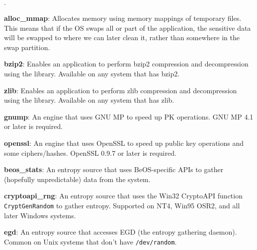 \documentclass{article}
\begin{document}
\newcommand{\mod}[2]{\textbf{#1}: #2}

\begin{list}{$\cdot$}
  \item \mod{alloc\_mmap}{Allocates memory using memory mappings of temporary
         files. This means that if the OS swaps all or part of the application,
         the sensitive data will be swapped to where we can later clean it,
         rather than somewhere in the swap partition.}

  \item \mod{bzip2}{Enables an application to perform bzip2 compression
         and decompression using the library. Available on any system that has
         bzip2.}

  \item \mod{zlib}{Enables an application to perform zlib compression and
         decompression using the library. Available on any system that has
         zlib.}


  \item \mod{gnump}{An engine that uses GNU MP to speed up PK operations.
         GNU MP 4.1 or later is required.}

  \item \mod{openssl}{An engine that uses OpenSSL to speed up public key
                      operations and some ciphers/hashes. OpenSSL 0.9.7 or
                      later is required.}

  \item \mod{beos\_stats}{An entropy source that uses BeOS-specific
    APIs to gather (hopefully unpredictable) data from the system.}

  \item \mod{cryptoapi\_rng}{An entropy source that uses the Win32
    CryptoAPI function \texttt{CryptGenRandom} to gather
    entropy. Supported on NT4, Win95 OSR2, and all later Windows
    systems.}

  \item \mod{egd}{An entropy source that accesses EGD (the entropy
         gathering daemon). Common on Unix systems that don't have
         \texttt{/dev/random}.}


\end{list}
\end{document}
